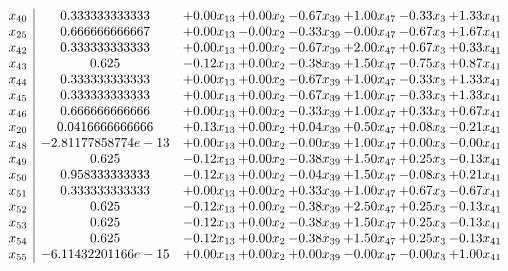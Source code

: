 \documentclass[8pt]{article}
\begin{document}
\[\begin{array}{c| c c@{\hskip 2pt} c@{\hskip 2pt} c@{\hskip 2pt} c@{\hskip 2pt} c@{\hskip 2pt} c@{\hskip 2pt} }
 x_{40}   &  0.333333333333 & +  0.00 x_{13} & +  0.00 x_{2} & -0.67 x_{39} & +  1.00 x_{47} & -0.33 x_{3} & +  1.33 x_{41}\\
 x_{25}   &  0.666666666667 & +  0.00 x_{13} & -0.00 x_{2} & -0.33 x_{39} & -0.00 x_{47} & -0.67 x_{3} & +  1.67 x_{41}\\
 x_{42}   &  0.333333333333 & +  0.00 x_{13} & +  0.00 x_{2} & -0.67 x_{39} & +  2.00 x_{47} & +  0.67 x_{3} & +  0.33 x_{41}\\
 x_{43}   &  0.625 & -0.12 x_{13} & +  0.00 x_{2} & -0.38 x_{39} & +  1.50 x_{47} & -0.75 x_{3} & +  0.87 x_{41}\\
 x_{44}   &  0.333333333333 & +  0.00 x_{13} & +  0.00 x_{2} & -0.67 x_{39} & +  1.00 x_{47} & -0.33 x_{3} & +  1.33 x_{41}\\
 x_{45}   &  0.333333333333 & +  0.00 x_{13} & +  0.00 x_{2} & -0.67 x_{39} & +  1.00 x_{47} & -0.33 x_{3} & +  1.33 x_{41}\\
 x_{46}   &  0.666666666666 & +  0.00 x_{13} & +  0.00 x_{2} & -0.33 x_{39} & +  1.00 x_{47} & +  0.33 x_{3} & +  0.67 x_{41}\\
 x_{20}   &  0.0416666666666 & +  0.13 x_{13} & +  0.00 x_{2} & +  0.04 x_{39} & +  0.50 x_{47} & +  0.08 x_{3} & -0.21 x_{41}\\
 x_{48}   &  -2.81177858774e-13 & +  0.00 x_{13} & +  0.00 x_{2} & -0.00 x_{39} & +  1.00 x_{47} & +  0.00 x_{3} & -0.00 x_{41}\\
 x_{49}   &  0.625 & -0.12 x_{13} & +  0.00 x_{2} & -0.38 x_{39} & +  1.50 x_{47} & +  0.25 x_{3} & -0.13 x_{41}\\
 x_{50}   &  0.958333333333 & -0.12 x_{13} & +  0.00 x_{2} & -0.04 x_{39} & +  1.50 x_{47} & -0.08 x_{3} & +  0.21 x_{41}\\
 x_{51}   &  0.333333333333 & +  0.00 x_{13} & +  0.00 x_{2} & +  0.33 x_{39} & +  1.00 x_{47} & +  0.67 x_{3} & -0.67 x_{41}\\
 x_{52}   &  0.625 & -0.12 x_{13} & +  0.00 x_{2} & -0.38 x_{39} & +  2.50 x_{47} & +  0.25 x_{3} & -0.13 x_{41}\\
 x_{53}   &  0.625 & -0.12 x_{13} & +  0.00 x_{2} & -0.38 x_{39} & +  1.50 x_{47} & +  0.25 x_{3} & -0.13 x_{41}\\
 x_{54}   &  0.625 & -0.12 x_{13} & +  0.00 x_{2} & -0.38 x_{39} & +  1.50 x_{47} & +  0.25 x_{3} & -0.13 x_{41}\\
 x_{55}   &  -6.11432201166e-15 & +  0.00 x_{13} & +  0.00 x_{2} & +  0.00 x_{39} & -0.00 x_{47} & -0.00 x_{3} & +  1.00 x_{41}\\

\end{array}\]
\end{document}
